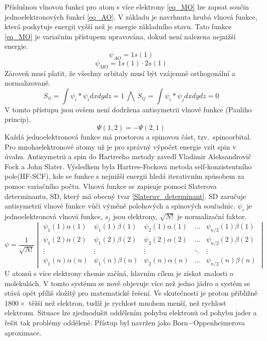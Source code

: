 \documentclass[
  digital, %
  table,   %
  lof,     %
  lot,     %
]{fithesis3}
\begin{document}
Příslušnou vlnovou funkci pro atom s více elektrony \ref{eq_MO} lze zapsat součin jednoelektronových funkcí \ref{eq_AO}.  V základu je navrhnuta hrubá vlnová funkce, která poskytuje energii vyšší než je energie základního stavu. Tato funkce \ref{eq_MO} je variačním přístupem upravována, dokud není nalezena nejnižší energie.  
\begin{equation}
\psi_{AO} = 1s(1)
\label{eq_AO}
\end{equation}
\begin{equation}
\psi_{MO} = 1s(1) \cdot 2s(1)
\label{eq_MO}
\end{equation} 
Zároveň musí platit, že všechny orbitaly musí být vzájemně orthogonální a normalizované.
\begin{equation}
S_{ii} = \int \psi_i * \psi_i dx dy dz = 1 ~ \bigwedge ~ S_{ij} = \int \psi_i * \psi_j dx dy dz = 0
\end{equation}
V tomto přístupu jsou ovšem není dodržena antisymetrii vlnové funkce (Pauliho princip). \cite{warren1986ab}
\begin{equation}
\Psi (1,2) = - \Psi (2,1)
\label{Paulliho_princip}
\end{equation}
 Každá jednoelektronová funkce má prostorou a spinovou část, tzv.~spinoorbital. Pro mnohaelektronové atomy už je pro správný výpočet energie vzít spin v úvahu.  Antisymetrii a spin do Hartreeho metody zavedl Vladimir Aleksandrovič Fock a John Slater. Výsledkem byla Hartree-Fockova metoda self-konzistentního pole(HF-SCF), kde se funkce s nejnižší energii hledá iterativním způsobem za pomoc variačního počtu. Vlnová funkce se zapisuje pomocí Slaterova determinantu, SD, který má obecný tvar \ref{Slateruv_determinant}. SD zaručuje antisymetrii vlnové funkce vůči výměně polohových a spinových souřadnic. $\psi_i$ je jednoelektronová vlnová funkce, $s_j$ jsou elektrony, $\sqrt{N!}$ je normalizační faktor.
\begin{equation}
\psi =  \frac{1}{\sqrt{N!}}\begin{vmatrix}
\psi_1(1)\alpha(1) & \psi_1(1) \beta (1) & \psi_2(1)\alpha(1) & \dots & \psi_{n/2}(1)\beta(1) \\
\psi_1(2)\alpha(2) & \psi_1(2) \beta (2) & \psi_2(2)\alpha(2) & \dots & \psi_{n/2}(2)\beta(2) \\
\vdots             & \vdots              & \vdots             & \ddots & \vdots \\
\psi_1(n)\alpha(n) & \psi_1(n) \beta (n) & \psi_2(n)\alpha(n) & \dots & \psi_{n/2}(n)\beta(n) 
\end{vmatrix}
\label{Slateruv_determinant}
\end{equation}
U atomů s více  elektrony chemie začíná, hlavním cílem je získat znalosti o molekulách. V tomto systému se nově objevuje více než jedno jádro a systém se stává opět příliš složitý pro matematické řešení. Ve skutečnosti je proton přibližně $1800 \times$ těžší než elektron, tudíž je rychlost mnohem menší, než rychlost elektronu. Situace lze zjednodušit oddělením pohybu elektronů od pohybu jader a řešit tak problémy odděleně. Přístup byl navržen jako Born$-$Oppenheimerova aproximace.
\end{document}
